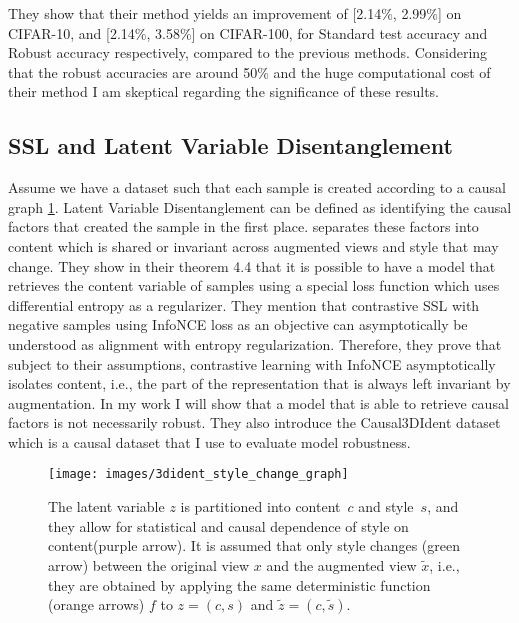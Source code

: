 \documentclass[../thesis.tex]{subfiles}
\begin{document}
	They show that their method yields an improvement of  [2.14\%, 2.99\%] on CIFAR-10, and [2.14\%, 3.58\%] on CIFAR-100, for Standard test accuracy and Robust accuracy respectively, compared to the previous methods. Considering that the robust accuracies are around 50\% and the huge computational cost of their method I am skeptical regarding the significance of these results. 
	
	
	
	
	
	
	\subsection{SSL and Latent Variable Disentanglement}
	\label{sec:disentanglement}
	Assume we have a dataset such that each sample is created according to a causal graph \ref{fig:3didentstylechangegraph}. Latent Variable Disentanglement can be defined as identifying the causal factors that created the sample in the first place. \cite{3dident} separates these factors into content which is shared or invariant across augmented views and style that may change. They show in their theorem 4.4 that it is possible to have a model that retrieves the content variable of samples using a special loss function which uses differential entropy as a regularizer. They mention that contrastive SSL with negative
samples using InfoNCE loss as an objective can asymptotically be understood as alignment with
entropy regularization. Therefore, they prove that subject to their assumptions, contrastive learning with
InfoNCE asymptotically isolates content, i.e., the part of the representation that is always left invariant by augmentation. In my work I will show that a model that is able to retrieve causal factors is not necessarily robust. They also introduce the Causal3DIdent dataset which is a causal dataset that I use to evaluate model robustness.  
	
	
	\begin{figure}
		\centering
		\texttt{[image: images/3dident\_style\_change\_graph]}
		\caption{ The latent variable $z$ is partitioned into content~$c$ and style~$s$, and they allow for statistical and causal dependence of style on content(purple arrow). It is assumed that only style changes (green arrow) between the original view $x$ and the augmented view $\tilde{x}$, i.e., they are obtained by applying the same deterministic function (orange arrows) $f$ to $z=(c,s)$ and $\tilde{z}=(c,\tilde{s})$.}
		\label{fig:3didentstylechangegraph}
	\end{figure}
	
	
\end{document}
